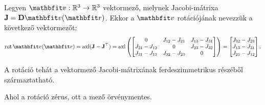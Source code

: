 \documentclass{szb-practice}
\begin{document}
\begin{definition}[Rotáció]
  Legyen $\rvec v: \Reals^3 \to \Reals^3$ vektormező, melynek Jacobi-mátrixa
  $\rmat J = \DD \rvec v(\coordvec)$. Ekkor a $\rvec v$ rotációjának nevezzük
  a következő vektormezőt:
  $$
    \rot \rvec v(\coordvec)
    = \operatorname{axl}(\rmat J - \rmat J^\T)
    = \operatorname{axl}\left(\begin{bmatrix}
        0               & J_{12} - J_{21} & J_{13} - J_{31} \\
        J_{21} - J_{12} & 0               & J_{23} - J_{32} \\
        J_{31} - J_{13} & J_{32} - J_{23} & 0
      \end{bmatrix}\right) = \begin{bmatrix}
      J_{32} - J_{23} \\
      J_{13} - J_{31} \\
      J_{21} - J_{12}
    \end{bmatrix}
    \text.
  $$
\end{definition}

\begin{note}
  A rotáció tehát a vektormező Jacobi-mátrixának ferdeszimmetrikus részéből
  származtatható.
\end{note}

\begin{note}
  Ahol a rotáció zérus, ott a mező örvénymentes.
\end{note}
\end{document}
